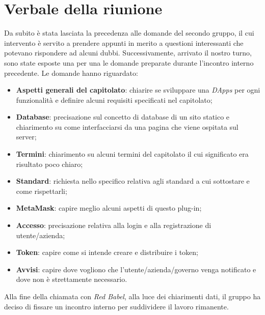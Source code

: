 \section{Verbale della riunione}
Da subito è stata lasciata la precedenza alle domande del secondo gruppo,
il cui intervento è servito a prendere appunti in merito a questioni interessanti
che potevano rispondere ad alcuni dubbi. Successivamente, arrivato il nostro turno,
sono state esposte una per una le domande preparate durante l'incontro interno 
precedente.\newline
Le domande hanno riguardato:

\begin{itemize}
	\item \textbf{Aspetti generali del capitolato}: chiarire se sviluppare una 
			\textit{DApps} per ogni funzionalità e definire alcuni requisiti specificati
			 nel capitolato;
	\item \textbf{Database}: precisazione sul concetto di database di un sito statico
			 e chiarimento su come interfacciarsi da una pagina che viene ospitata sul server;
	\item \textbf{Termini}: chiarimento su alcuni termini del capitolato il cui significato
			 era risultato poco chiaro;
	\item \textbf{Standard}: richiesta nello specifico relativa agli standard a cui sottostare
			 e come rispettarli;
	\item \textbf{MetaMask}: capire meglio alcuni aspetti di questo plug-in;
	\item \textbf{Accesso}: precisazione relativa alla login e alla registrazione di 
			 utente/azienda;
	\item \textbf{Token\glo{}}: capire come si intende creare e distribuire i token;
	\item \textbf{Avvisi}: capire dove vogliono che l'utente/azienda/governo venga 
			 notificato e dove non è strettamente necessario.
\end{itemize}
Alla fine della chiamata con \textit{Red Babel}, alla luce dei chiarimenti dati,
il gruppo ha deciso di fissare un incontro interno per suddividere il lavoro rimanente.
\pagebreak


